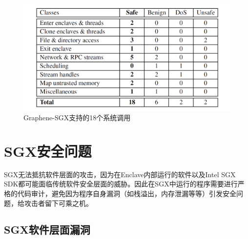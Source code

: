 \documentclass{source/Paper}
\begin{document}
        \begin{figure}[H]
            \centering
            \includegraphics[width=0.7\linewidth]{pic/graphene.png}
            \caption{Graphene-SGX支持的18个系统调用}
            \label{graphene}
        \end{figure}

    \section{SGX安全问题}

        SGX无法抵抗软件层面的攻击，因为在Enclave内部运行的软件以及Intel SGX SDK都可能面临传统软件安全层面的威胁。因此在SGX中运行的程序需要进行严格的代码审计，避免因为程序自身漏洞（如栈溢出，内存泄漏等等）引发安全问题，给攻击者留下可乘之机。

        \subsection{SGX软件层面漏洞}
\end{document}
